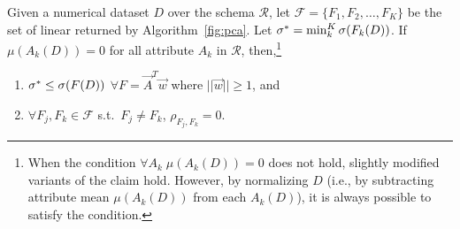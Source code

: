 \begin{theorem}\label{THM:ALGO2-CORRECTNESS}
    Given a numerical dataset $D$ over the schema $\mathcal{R}$, let
    $\mathcal{F} = \{F_1,F_2,\ldots, F_K\}$ be the set of linear \views
    returned by Algorithm~\ref{fig:pca}. Let $\sigma^* =
    \min_k^{K}{\mathtt{\sigma}}(F_k(D))$. If $\mu(A_k(D)) = 0$ for all attribute $A_k$ in
    $\mathcal{R}$, then,\footnote{When the condition $\forall A_k \;
    \mu(A_k(D)) = 0$ does not hold, slightly modified variants of the claim
    hold. However, by normalizing $D$ (i.e., by subtracting attribute mean
    $\mu(A_k(D))$ from each $A_k(D)$), it is always possible to satisfy the
    condition.}
%
	\begin{enumerate}[label=(\arabic*)]
            \item $\sigma^* \leq {\mathtt{\sigma}}(F(D))$ $\forall F=\vec{A}^T\vec{w}$ where $||\vec{w}||\geq 1$, and
    \item $\forall F_j, F_k \in \mathcal{F}$ s.t.\ $F_j\neq F_k$, 
        $\rho_{F_j, F_k} = 0$.
	\end{enumerate}
\end{theorem}





